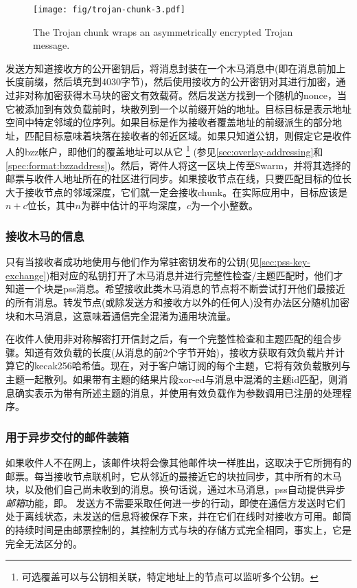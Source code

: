 \begin{figure}[htbp]
\centering
\texttt{[image: fig/trojan-chunk-3.pdf]}
\caption[Trojan chunk\statusgreen]{The Trojan chunk wraps an asymmetrically encrypted Trojan message.}
\label{fig:trojan-chunk}
\end{figure}

发送方知道接收方的公开密钥后，将消息封装在一个木马消息中(即在消息前加上长度前缀，然后填充到4030字节)，然后使用接收方的公开密钥对其进行加密，通过非对称加密获得木马块的密文有效载荷。然后发送方找到一个随机的nonce，当它被添加到有效负载前时，块散列到一个以前缀开始的地址。目标目标是表示地址空间中特定邻域的位序列。如果目标是作为接收者覆盖地址的前缀派生的部分地址，匹配目标意味着块落在接收者的邻近区域。如果只知道公钥，则假定它是收件人的bzz帐户，即他们的覆盖地址可以从它%
%
\footnote{可选覆盖可以与公钥相关联，特定地址上的节点可以监听多个公钥。}
%
(参见\ref{sec:overlay-addressing}和\ref{spec:format:bzzaddress})。然后，寄件人将这一区块上传至Swarm，并将其选择的邮票与收件人地址所在的社区进行同步。如果接收节点在线，只要匹配目标的位长大于接收节点的邻域深度，它们就一定会接收chunk。在实际应用中，目标应该是$n+c$位长，其中$n$为群中估计的平均深度，$c$为一个小整数。 

\subsubsection{接收木马的信息}

只有当接收者成功地使用与他们作为常驻密钥发布的公钥(见\ref{sec:pss-key-exchange})相对应的私钥打开了木马消息并进行完整性检查/主题匹配时，他们才知道一个块是pss消息。希望接收此类木马消息的节点将不断尝试打开他们最接近的所有消息。转发节点(或除发送方和接收方以外的任何人)没有办法区分随机加密块和木马消息，这意味着通信完全混淆为通用块流量。

在收件人使用非对称解密打开信封之后，有一个完整性检查和主题匹配的组合步骤。知道有效负载的长度(从消息的前2个字节开始)，接收方获取有效负载片并计算它的kecak256哈希值。现在，对于客户端订阅的每个主题，它将有效负载散列与主题一起散列。如果带有主题的结果片段xor-ed与消息中混淆的主题id匹配，则消息确实表示为带有所述主题的消息，并使用有效负载作为参数调用已注册的处理程序。

\subsubsection{用于异步交付的邮件装箱}

如果收件人不在网上，该邮件块将会像其他邮件块一样胜出，这取决于它所拥有的邮票。每当接收节点联机时，它从邻近的最接近它的块拉同步，其中所有的木马块，以及他们自己尚未收到的消息。换句话说，通过木马消息，pss自动提供异步\emph{邮箱}功能，即。 
发送方不需要采取任何进一步的行动，即使在通信方发送时它们处于离线状态，未发送的信息将被保存下来，并在它们在线时对接收方可用。邮筒的持续时间是由邮票控制的，其控制方式与块的存储方式完全相同，事实上，它是完全无法区分的。

